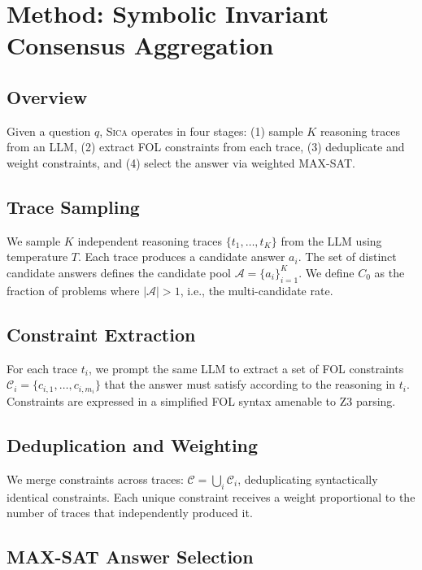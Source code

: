 \documentclass[11pt,a4paper]{article}
\newcommand{\sica}{\textsc{Sica}}
\newcommand{\czero}{C_0}
\begin{document}
\section{Method: Symbolic Invariant Consensus Aggregation}

\subsection{Overview}

Given a question $q$, \sica{} operates in four stages: (1) sample $K$ reasoning traces from an LLM, (2) extract FOL constraints from each trace, (3) deduplicate and weight constraints, and (4) select the answer via weighted MAX-SAT.

\subsection{Trace Sampling}

We sample $K$ independent reasoning traces $\{t_1, \ldots, t_K\}$ from the LLM using temperature $T$. Each trace produces a candidate answer $a_i$. The set of distinct candidate answers defines the candidate pool $\mathcal{A} = \{a_i\}_{i=1}^{K}$. We define $\czero$ as the fraction of problems where $|\mathcal{A}| > 1$, i.e., the multi-candidate rate.

\subsection{Constraint Extraction}

For each trace $t_i$, we prompt the same LLM to extract a set of FOL constraints $\mathcal{C}_i = \{c_{i,1}, \ldots, c_{i,m_i}\}$ that the answer must satisfy according to the reasoning in $t_i$. Constraints are expressed in a simplified FOL syntax amenable to Z3 parsing.

\subsection{Deduplication and Weighting}

We merge constraints across traces: $\mathcal{C} = \bigcup_i \mathcal{C}_i$, deduplicating syntactically identical constraints. Each unique constraint receives a weight proportional to the number of traces that independently produced it.

\subsection{MAX-SAT Answer Selection}
\end{document}
